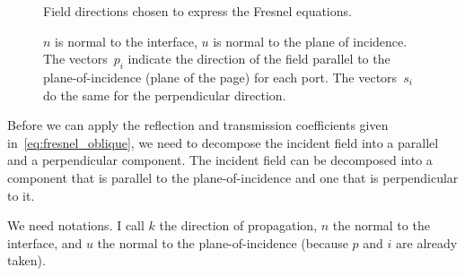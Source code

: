 %

\begin{figure}[hbtp]
    \centering
    
    \caption{\label{fig:fresnel_directions}Field directions chosen to express the Fresnel equations.}
    \caption*{
        $n$ is normal to the interface, $u$ is normal to the plane of incidence.
        The vectors~$p_i$ indicate the direction of the field parallel to the plane-of-incidence (plane of the page) for each port.  The vectors~$s_i$ do the same for the perpendicular direction.
    }
\end{figure}

Before we can apply the reflection and transmission coefficients given in~\eqref{eq:fresnel_oblique}, we need to decompose the incident field into a parallel and a perpendicular component.
The incident field can be decomposed into a component that is parallel to the plane-of-incidence and one that is perpendicular to it.

We need notations.
I call $k$ the direction of propagation, $n$ the normal to the interface, and $u$ the normal to the plane-of-incidence (because $p$ and $i$ are already taken).


